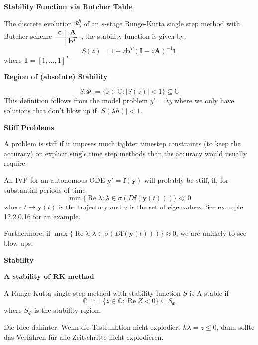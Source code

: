 \documentclass{sciposter}
\renewcommand{\vec}[1]{\mathbf{#1}}
\newenvironment{method}[1]{\begin{mdframed}[backgroundcolor=blue!10,innertopmargin=15pt, innerbottommargin=15pt, nobreak=true]
		\textbf{#1 }
	}
	{ 
	\end{mdframed}
}
\newcommand{\psection}[1]{\par \textbf{\large#1}}
\begin{document}
\begin{multicols}{2}
\begin{method}{Stability Function via Butcher Table}
	The discrete evolution $\Psi_\lambda ^h$ of an $s$-stage Runge-Kutta single step method with Butcher scheme 	$\begin{array}
		{c|c}
		\vec{c} &  \vec{A} \\
		\hline
		& \vec{b}^T
	\end{array}$, the stability function is given by:
	$$S(z) = 1 + z\vec{b}^T(\vec{I} - z\vec{A})^{-1}\vec{1}$$
	where $\vec{1} = [1,\ldots,1]^T$
	
\end{method}

\begin{method}{Region of (absolute) Stability}
	$$S:\Phi := \{z \in \mathbb{C} : |S(z)| < 1  \} \subseteq \mathbb{C}$$
	This definition follows from the model problem $y' = \lambda y$ where we only have solutions that don't blow up if $|S(\lambda h)|<1$.
\end{method}

\begin{method}{Stiff Problems}
	A problem is stiff if it imposes much tighter timestep constraints (to keep the accuracy) on explicit single time step methods than the accuracy would usually require.
	
	An IVP for an autonomous ODE $\vec{y'} = \vec{f}(\vec{y})$ will probably be stiff, if, for substantial periods of time:
	$$\min\{\operatorname{Re} \lambda : \lambda \in \sigma (D\vec{f}(\vec{y}(t)))\} \ll 0$$
	where $t\to \vec{y}(t)$ is the trajectory and $\sigma$ is the set of eigenvalues. See example 12.2.0.16 for an example.
	
	Furthermore, if $\max\{\operatorname{Re} \lambda : \lambda \in \sigma (D\vec{f}(\vec{y}(t)))\} \approx 0$, we are unlikely to see blow ups.
\end{method}



\psection{Stability}

\begin{method}{A stability of RK method}
	A Runge-Kutta single step method with stability function $S$ is A-stable if
	$$\mathbb{C}^- := \{z \in \mathbb{C} : \operatorname{Re} Z < 0\} \subseteq S_\Phi$$
	where $S_\Phi$ is the stability region.
	
	Die Idee dahinter: Wenn die Testfunktion nicht explodiert $h\lambda = z \leq 0$, dann sollte das Verfahren für alle Zeitschritte nicht explodieren.
\end{method}


\end{multicols}
\end{document}
